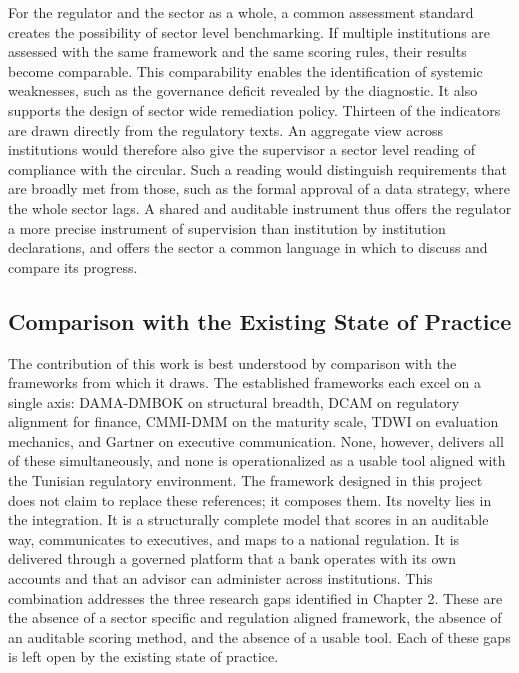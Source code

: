 For the regulator and the sector as a whole, a common assessment standard creates the possibility of sector level benchmarking. If multiple institutions are assessed with the same framework and the same scoring rules, their results become comparable. This comparability enables the identification of systemic weaknesses, such as the governance deficit revealed by the diagnostic. It also supports the design of sector wide remediation policy. Thirteen of the indicators are drawn directly from the regulatory texts. An aggregate view across institutions would therefore also give the supervisor a sector level reading of compliance with the circular. Such a reading would distinguish requirements that are broadly met from those, such as the formal approval of a data strategy, where the whole sector lags. A shared and auditable instrument thus offers the regulator a more precise instrument of supervision than institution by institution declarations, and offers the sector a common language in which to discuss and compare its progress.

\subsection{Comparison with the Existing State of Practice}

The contribution of this work is best understood by comparison with the frameworks from which it draws. The established frameworks each excel on a single axis: DAMA-DMBOK on structural breadth, DCAM on regulatory alignment for finance, CMMI-DMM on the maturity scale, TDWI on evaluation mechanics, and Gartner on executive communication. None, however, delivers all of these simultaneously, and none is operationalized as a usable tool aligned with the Tunisian regulatory environment. The framework designed in this project does not claim to replace these references; it composes them. Its novelty lies in the integration. It is a structurally complete model that scores in an auditable way, communicates to executives, and maps to a national regulation. It is delivered through a governed platform that a bank operates with its own accounts and that an advisor can administer across institutions. This combination addresses the three research gaps identified in Chapter 2. These are the absence of a sector specific and regulation aligned framework, the absence of an auditable scoring method, and the absence of a usable tool. Each of these gaps is left open by the existing state of practice.

